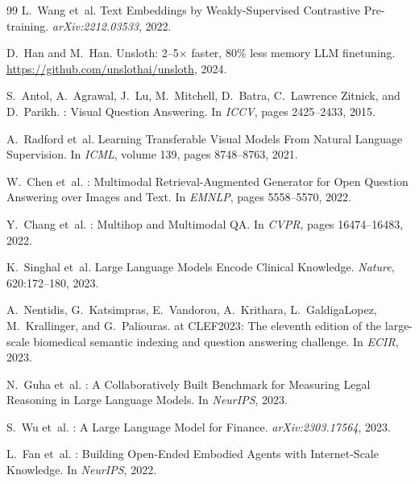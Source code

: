 \documentclass[11pt,a4paper]{article}
\begin{document}
\begin{thebibliography}{99}
L.~Wang et~al.
\newblock Text Embeddings by Weakly-Supervised Contrastive Pre-training.
\newblock \textit{arXiv:2212.03533}, 2022.

D.~Han and M.~Han.
\newblock Unsloth: 2--5$\times$ faster, 80\% less memory LLM finetuning.
\newblock \url{https://github.com/unslothai/unsloth}, 2024.

S.~Antol, A.~Agrawal, J.~Lu, M.~Mitchell, D.~Batra, C.~Lawrence Zitnick, and D.~Parikh.
: Visual Question Answering.
\newblock In \textit{ICCV}, pages 2425--2433, 2015.

A.~Radford et~al.
\newblock Learning Transferable Visual Models From Natural Language Supervision.
\newblock In \textit{ICML}, volume 139, pages 8748--8763, 2021.

W.~Chen et~al.
: Multimodal Retrieval-Augmented Generator for Open Question Answering over Images and Text.
\newblock In \textit{EMNLP}, pages 5558--5570, 2022.

Y.~Chang et~al.
: Multihop and Multimodal {QA}.
\newblock In \textit{CVPR}, pages 16474--16483, 2022.

K.~Singhal et~al.
\newblock Large Language Models Encode Clinical Knowledge.
\newblock \textit{Nature}, 620:172--180, 2023.

A.~Nentidis, G.~Katsimpras, E.~Vandorou, A.~Krithara, L.~Galdiga\-Lopez, M.~Krallinger, and G.~Paliouras.
 at {CLEF2023}: The eleventh edition of the large-scale biomedical semantic indexing and question answering challenge.
\newblock In \textit{ECIR}, 2023.

N.~Guha et~al.
: A Collaboratively Built Benchmark for Measuring Legal Reasoning in Large Language Models.
\newblock In \textit{NeurIPS}, 2023.

S.~Wu et~al.
: A Large Language Model for Finance.
\newblock \textit{arXiv:2303.17564}, 2023.

L.~Fan et~al.
: Building Open-Ended Embodied Agents with Internet-Scale Knowledge.
\newblock In \textit{NeurIPS}, 2022.


\end{thebibliography}
\end{document}
